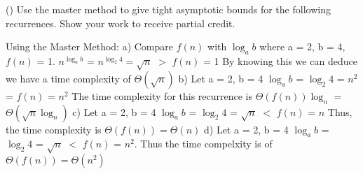 \documentclass[addpoints,11pt]{exam}
\begin{document}
\begin{questions}


\question(\totalpoints {})
Use the master method to give tight asymptotic bounds for the following recurrences.  Show your work to receive partial credit.

\begin{solutionorbox}
Using the Master Method: \newline
a)\newline
 Compare $f(n)$ with $\log_{a}b $ where a = 2, b = 4, $f(n)$ = 1. \newline
$n^{\log_{a}b}$ = $n^{\log_{2}4} = \sqrt{n}$ $>$ $f(n)$ = 1 \newline
By knowing this we can deduce we have a time complexity of $\Theta(\sqrt{n})$\newline
b) \newline
Let a = 2, b = 4 \newline
$\log_{a}b $ = $\log_{2}4 $ = $n^2$ = $f(n)$ = $n^2$
The time complexity for this recurrence is $\Theta(f(n))\log_{n}$ = $\Theta(\sqrt{n}\log_{n})$ \newline
c) \newline
Let a = 2, b = 4 \newline
$\log_{a}b $ = $\log_{2}4 $ = $\sqrt{n}$ $<$ $f(n)$ = $n$
Thus, the time complexity is $\Theta(f(n)) = \Theta(n)$ \newline
d) \newline
Let a = 2, b = 4 \newline
$\log_{a}b $ = $\log_{2}4 $ = $\sqrt{n}$ $<$ $f(n)$ = $n^2$. \newline
Thus the time compelxity is of $\Theta(f(n)) = \Theta(n^2)$
\end{solutionorbox}


\end{questions}
\end{document}
